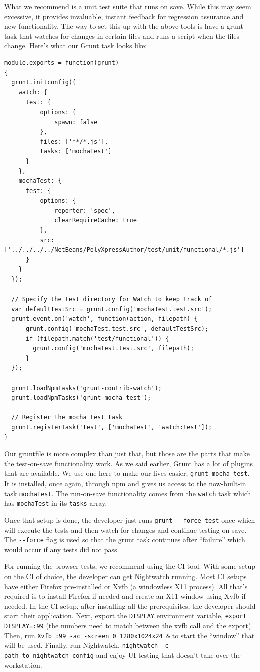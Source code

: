 \documentclass[12pt]{ucthesis}
\begin{document}
What we recommend is a unit test suite that runs on save. While this may seem excessive, it provides invaluable, instant feedback for regression assurance and new functionality. The way to set this up with the above tools is have a grunt task that watches for changes in certain files and runs a script when the files change. Here's what our Grunt task looks like:
\begin{lstlisting}
module.exports = function(grunt)
{
  grunt.initconfig({
    watch: {
      test: {
          options: {
              spawn: false
          },
          files: ['**/*.js'],
          tasks: ['mochaTest']
      }
    },
    mochaTest: {
      test: {
          options: {
              reporter: 'spec',
              clearRequireCache: true
          },
          src: ['../../../../NetBeans/PolyXpressAuthor/test/unit/functional/*.js']
      }
    }
  });

  // Specify the test directory for Watch to keep track of
  var defaultTestSrc = grunt.config('mochaTest.test.src');
  grunt.event.on('watch', function(action, filepath) {
      grunt.config('mochaTest.test.src', defaultTestSrc);
      if (filepath.match('test/functional')) {
        grunt.config('mochaTest.test.src', filepath);
      }
  });

  grunt.loadNpmTasks('grunt-contrib-watch');
  grunt.loadNpmTasks('grunt-mocha-test');

  // Register the mocha test task
  grunt.registerTask('test', ['mochaTest', 'watch:test']);
}
\end{lstlisting}

Our gruntfile is more complex than just that, but those are the parts that make the test-on-save functionality work. As we said earlier, Grunt has a lot of plugins that are available. We use one here to make our lives easier, \lstinline{grunt-mocha-test}. It is installed, once again, through npm and gives us access to the now-built-in task \lstinline{mochaTest}. The run-on-save functionality comes from the \lstinline{watch} task which has \lstinline{mochaTest} in its \lstinline{tasks} array.

Once that setup is done, the developer just runs \lstinline{grunt --force test} once which will execute the tests and then watch for changes and continue testing on save. The \lstinline{--force} flag is used so that the grunt task continues after ``failure'' which would occur if any tests did not pass.

For running the browser tests, we recommend using the CI tool. With some setup on the CI of choice, the developer can get Nightwatch running. Most CI setups have either Firefox pre-installed or Xvfb (a windowless X11 process). All that's required is to install Firefox if needed and create an X11 window using Xvfb if needed. In the CI setup, after installing all the prerequisites, the developer should start their application. Next, export the \lstinline{DISPLAY} environment variable, \lstinline{export DISPLAY=:99} (the numbers need to match between the xvfb call and the export). Then, run \lstinline{Xvfb :99 -ac -screen 0 1280x1024x24 &} to start the ``window'' that will be used. Finally, run Nightwatch, \lstinline{nightwatch -c path_to_nightwatch_config} and enjoy UI testing that doesn't take over the workstation.
\end{document}
